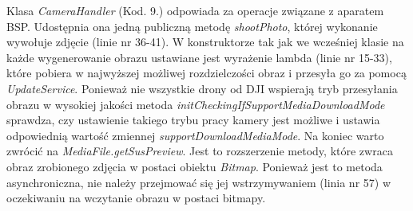 Klasa \textit{CameraHandler} (Kod. 9.) odpowiada za operacje związane z aparatem BSP. Udostępnia ona jedną publiczną metodę \textit{shootPhoto}, której wykonanie wywołuje zdjęcie (linie nr 36-41). W konstruktorze tak jak we wcześniej klasie na każde wygenerowanie obrazu ustawiane jest wyrażenie lambda (linie nr 15-33), które pobiera w najwyższej możliwej rozdzielczości obraz i przesyła go za pomocą \textit{UpdateService}. Ponieważ nie wszystkie drony od DJI wspierają tryb przesyłania obrazu w wysokiej jakości metoda \textit{initCheckingIfSupportMediaDownloadMode} sprawdza, czy ustawienie takiego trybu pracy kamery jest możliwe i ustawia odpowiednią wartość zmiennej \textit{supportDownloadMediaMode}. Na koniec warto zwrócić na \textit{MediaFile.getSusPreview}. Jest to rozszerzenie metody, które zwraca obraz zrobionego zdjęcia w postaci obiektu \textit{Bitmap}. Ponieważ jest to metoda asynchroniczna, nie należy przejmować się jej wstrzymywaniem (linia nr 57) w oczekiwaniu na wczytanie obrazu w postaci bitmapy.
  
